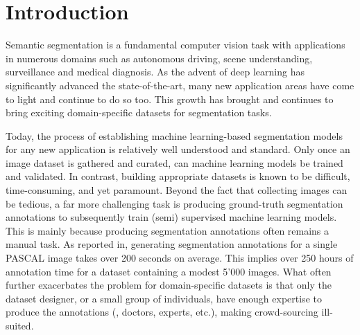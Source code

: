 \section{Introduction}
\label{sec:full_weakintro}
Semantic segmentation is a fundamental computer vision task with applications in numerous domains such as autonomous driving, scene understanding, surveillance and medical diagnosis. As the advent of deep learning has significantly advanced the state-of-the-art, many new application areas have come to light and continue to do so too. This growth has brought and continues to bring exciting domain-specific datasets for segmentation tasks. 

Today, the process of establishing machine learning-based segmentation models for any new application is relatively well understood and standard. Only once an image dataset is gathered and curated, can machine learning models be trained and validated. In contrast, building appropriate datasets is known to be difficult, time-consuming, and yet paramount. Beyond the fact that collecting images can be tedious, a far more challenging task is producing ground-truth segmentation annotations to subsequently train (semi) supervised machine learning models. This is mainly because producing segmentation annotations often remains a manual task. As reported in, generating segmentation annotations for a single PASCAL image takes over 200 seconds on average. This implies over 250 hours of annotation time for a dataset containing a modest 5'000 images. What often further exacerbates the problem for domain-specific datasets is that only the dataset designer, or a small group of individuals, have enough expertise to produce the annotations (\eg, doctors, experts, etc.), making crowd-sourcing ill-suited. 

